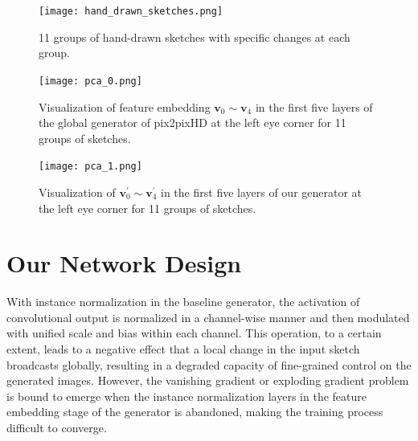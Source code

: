 \begin{figure}[htbp]
	\centering
	\texttt{[image: hand\_drawn\_sketches.png]}
	\caption{11 groups of hand-drawn sketches with specific changes at each group. 
	}
	\label{fig:hand_drawn_contours}
\end{figure}


\begin{figure}[htb]
	\centering
	\texttt{[image: pca\_0.png]}
	\caption{Visualization of feature embedding $\boldsymbol{v}_0\sim\boldsymbol{v}_4$ in the first five layers of the global generator of pix2pixHD at the left eye corner for 11 groups of sketches.  }
	\label{fig:pca_0}
\end{figure}      

\begin{figure}[htb]
	\centering
	\texttt{[image: pca\_1.png]}
	\caption{Visualization of  $\boldsymbol{v}_0^{'}\sim\boldsymbol{v}_4^{'}$ in the first five layers of our generator at the left eye corner for 11 groups of sketches.}
	\label{fig:pca_1}
\end{figure}


\section{Our Network Design}\label{sec:network}
%
 
With instance normalization in the baseline generator, the activation of convolutional output is normalized in a channel-wise manner and then modulated with unified scale and bias within each channel. 
This operation, to a certain extent, leads to a negative effect that a local change in the input sketch broadcasts globally, resulting in a degraded capacity of fine-grained control on the generated images.
However, the vanishing gradient or exploding gradient problem is bound to emerge when the instance normalization layers in the feature embedding stage of the generator is abandoned, making the training process difficult to converge. 
 
